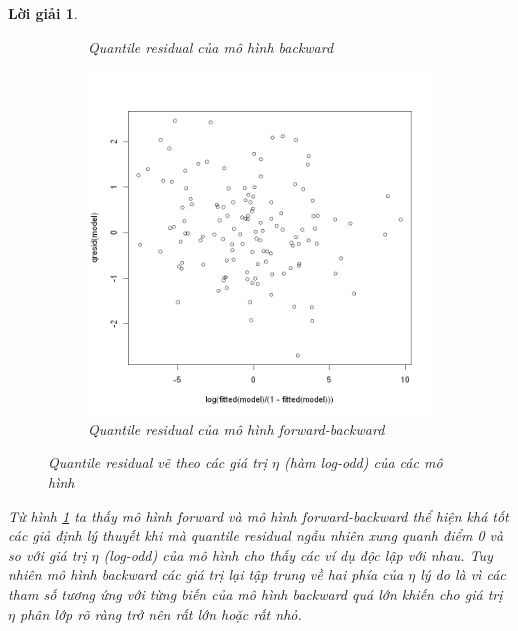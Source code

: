 \documentclass[14pt, a4paper]{article}
\theoremstyle{sltheorem}
\theoremstyle{soltheorem}
\newtheorem*{loigiai}{Lời giải}
\begin{document}
\begin{loigiai}
\begin{figure}[h!]
\begin{subfigure}[b]{0.4\linewidth}
            \caption{Quantile residual của mô hình backward}
        \end{subfigure}
        \hfill
        \begin{subfigure}[b]{0.4\textwidth}
            \centering
            \includegraphics[width=1.0\linewidth]{figures/mbo_fitted.png}
            \caption{Quantile residual của mô hình forward-backward}
        \end{subfigure}
        \caption{Quantile residual vẽ theo các giá trị $\eta$ (hàm log-odd) của các mô hình}
        \label{fig:Quantile-fitted}
    \end{figure}

    Từ hình \ref{fig:Quantile-fitted} ta thấy mô hình forward và mô hình forward-backward thể hiện khá tốt các giả định lý thuyết khi mà quantile residual ngẫu nhiên xung quanh điểm 0 và so với giá trị $\eta$ (log-odd) của mô hình cho thấy các ví dụ độc lập với nhau.
    Tuy nhiên mô hình backward các giá trị lại tập trung về hai phía của $\eta$ lý do là vì các tham số tương ứng với từng biến của mô hình backward quá lớn khiến cho giá trị $\eta$ phân lớp rõ ràng trở nên rất lớn hoặc rất nhỏ.


\end{loigiai}
\end{document}
